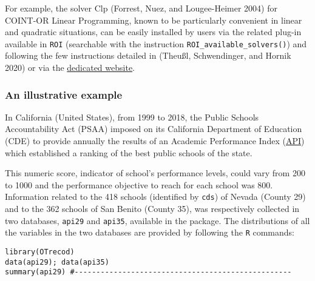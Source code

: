 For example, the solver Clp (Forrest, Nuez, and Lougee-Heimer 2004) for COINT-OR Linear Programming, known to be particularly convenient in linear and quadratic situations, can be easily installed by users via the related plug-in available in \texttt{ROI} (searchable with the instruction \texttt{ROI\_available\_solvers()}) and following the few instructions detailed in (Theußl, Schwendinger, and Hornik 2020) or via the \href{https://roi.r-forge.r-project.org/installation.html}{dedicated website}.

\hypertarget{an-illustrative-example}{%
\subsubsection{An illustrative example}\label{an-illustrative-example}}

In California (United States), from 1999 to 2018, the Public Schools Accountability Act (PSAA) imposed on its California Department of Education (CDE) to provide annually the results of an Academic Performance Index (\href{https://www.ed-data.org/article/Understanding-the-Academic-Performance-Index-(API)}{API}) which established a ranking of the best public schools of the state.

This numeric score, indicator of school's performance levels, could vary from 200 to 1000 and the performance objective to reach for each school was 800. Information related to the 418 schools (identified by \texttt{cds}) of Nevada (County 29) and to the 362 schools of San Benito (County 35), was respectively collected in two databases, \texttt{api29} and \texttt{api35}, available in the package. The distributions of all the variables in the two databases are provided by following the \texttt{R} commands:

\begin{verbatim}
library(OTrecod)
data(api29); data(api35)
summary(api29) #--------------------------------------------------
\end{verbatim}

